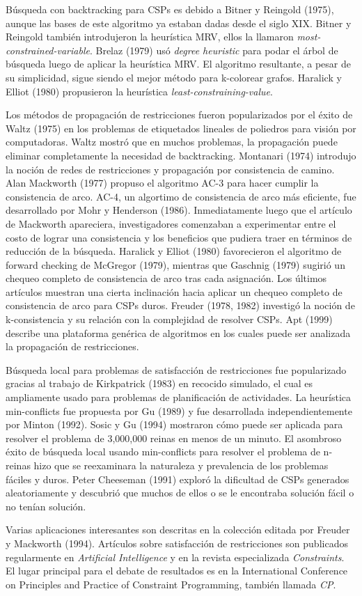 B\'usqueda con backtracking para CSPs es debido a Bitner y Reingold (1975), aunque las bases de este algoritmo ya estaban dadas desde el siglo XIX. Bitner y Reingold tambi\'en introdujeron la heur\'istica MRV, ellos la llamaron \emph{most-constrained-variable}. Brelaz (1979) us\'o \emph{degree heuristic} para podar el \'arbol de b\'usqueda luego de aplicar la heur\'istica MRV. El algoritmo resultante, a pesar de su simplicidad, sigue siendo el mejor m\'etodo para k-colorear grafos. Haralick y Elliot (1980) propusieron la heur\'istica \emph{least-constraining-value}.

Los m\'etodos de propagaci\'on de restricciones fueron popularizados por el \'exito de Waltz (1975) en los problemas de etiquetados lineales de poliedros para visi\'on por computadoras. Waltz mostr\'o que en muchos problemas, la propagaci\'on puede eliminar completamente la necesidad de backtracking. Montanari (1974) introdujo la noci\'on de redes de restricciones y propagaci\'on por consistencia de camino. Alan Mackworth (1977) propuso el algoritmo AC-3 para hacer cumplir la consistencia de arco. AC-4, un algortimo de consistencia de arco m\'as eficiente, fue desarrollado por Mohr y Henderson (1986). Inmediatamente luego que el art\'iculo de Mackworth apareciera, investigadores comenzaban a experimentar entre el costo de lograr una consistencia y los beneficios que pudiera traer en t\'erminos de reducci\'on de la b\'usqueda. Haralick y Elliot (1980) favorecieron el algoritmo de forward checking de McGregor (1979), mientras que Gaschnig (1979) sugiri\'o un chequeo completo de consistencia de arco tras cada asignaci\'on. Los \'ultimos art\'iculos muestran una cierta inclinaci\'on hacia aplicar un chequeo completo de consistencia de arco para CSPs duros. Freuder (1978, 1982) investig\'o la noci\'on de k-consistencia y su relaci\'on con la complejidad de resolver CSPs. Apt (1999) describe una plataforma gen\'erica de algoritmos en los cuales puede ser analizada la propagaci\'on de restricciones.

B\'usqueda local para problemas de satisfacci\'on de restricciones fue popularizado gracias al trabajo de Kirkpatrick (1983) en recocido simulado, el cual es ampliamente usado para problemas de planificaci\'on de actividades. La heur\'istica min-conflicts fue propuesta por Gu (1989) y fue desarrollada independientemente por Minton (1992). Sosic y Gu (1994) mostraron c\'omo puede ser aplicada para resolver el problema de 3,000,000 reinas en menos de un minuto. El asombroso \'exito de b\'usqueda local usando min-conflicts para resolver el problema de n-reinas hizo que se reexaminara la naturaleza y prevalencia de los problemas f\'aciles y duros. Peter Cheeseman (1991) explor\'o la dificultad de CSPs generados aleatoriamente y descubri\'o que muchos de ellos o se le encontraba soluci\'on f\'acil o no ten\'ian soluci\'on.

Varias aplicaciones interesantes son descritas en la colecci\'on editada por Freuder y Mackworth (1994). Art\'iculos sobre satisfacci\'on de restricciones son publicados regularmente en \emph{Artificial Intelligence} y en la revista especializada \emph{Constraints}. El lugar principal para el debate de resultados es en la International Conference on Principles and Practice of Constraint Programming, tambi\'en llamada \emph{CP}.
